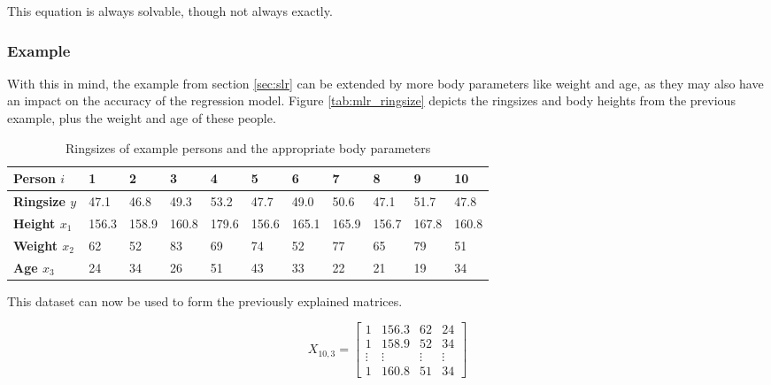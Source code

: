 This equation is always solvable, though not always exactly.

\subsubsection{Example}

With this in mind, the example from section \vref{sec:slr} can be extended by more body parameters like weight and age, as they may also have an impact on the accuracy of the regression model. Figure \vref{tab:mlr_ringsize} depicts the ringsizes and body heights from the previous example, plus the weight and age of these people.

\begin{table}[H]
    \centering
    \begin{tabular}{|l|l|l|l|l|l|l|l|l|l|l|}
    \hline
    \textbf{Person $ i $}    & \textbf{1} & \textbf{2} & \textbf{3} & \textbf{4} & \textbf{5} & \textbf{6} & \textbf{7} & \textbf{8} & \textbf{9} & \textbf{10} \\ \hline
    \textbf{Ringsize $ y $}  & 47.1       & 46.8       & 49.3       & 53.2       & 47.7       & 49.0       & 50.6       & 47.1       & 51.7       & 47.8        \\ \hline
    \textbf{Height $ x_1 $}  & 156.3      & 158.9      & 160.8      & 179.6      & 156.6      & 165.1      & 165.9      & 156.7      & 167.8      & 160.8       \\ \hline
    \textbf{Weight $ x_2 $}  & 62         & 52         & 83         & 69         & 74         & 52         & 77         & 65         & 79         & 51          \\ \hline
    \textbf{Age $ x_3 $}     & 24         & 34         & 26         & 51         & 43         & 33         & 22         & 21         & 19         & 34          \\ \hline
    \end{tabular}
    \caption{Ringsizes of example persons and the appropriate body parameters}
    \label{tab:mlr_ringsize}
\end{table}

This dataset can now be used to form the previously explained matrices.

\begin{equation}
    X_{10, 3} =
    \begin{bmatrix}
        1 & 156.3 & 62 & 24 \\
        1 & 158.9 & 52 & 34 \\
        \vdots & \vdots & \vdots & \vdots \\
        1 & 160.8 & 51 & 34
    \end{bmatrix}
\end{equation}

